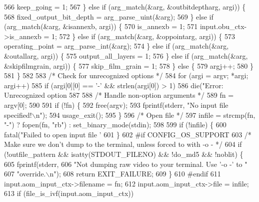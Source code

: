 \begin{DoxyCodeInclude}
{{{{{{{{{{{{{{{{{{{{{{{{{{{{566       keep\_going = 1;
567     \} \textcolor{keywordflow}{else} \textcolor{keywordflow}{if} (arg\_match(&arg, &outbitdeptharg, argi)) \{
568       fixed\_output\_bit\_depth = arg\_parse\_uint(&arg);
569     \} \textcolor{keywordflow}{else} \textcolor{keywordflow}{if} (arg\_match(&arg, &isannexb, argi)) \{
570       is\_annexb = 1;
571       input.obu\_ctx->is\_annexb = 1;
572     \} \textcolor{keywordflow}{else} \textcolor{keywordflow}{if} (arg\_match(&arg, &oppointarg, argi)) \{
573       operating\_point = arg\_parse\_int(&arg);
574     \} \textcolor{keywordflow}{else} \textcolor{keywordflow}{if} (arg\_match(&arg, &outallarg, argi)) \{
575       output\_all\_layers = 1;
576     \} \textcolor{keywordflow}{else} \textcolor{keywordflow}{if} (arg\_match(&arg, &skipfilmgrain, argi)) \{
577       skip\_film\_grain = 1;
578     \} \textcolor{keywordflow}{else} \{
579       argj++;
580     \}
581   \}
582 
583   \textcolor{comment}{/* Check for unrecognized options */}
584   \textcolor{keywordflow}{for} (argi = argv; *argi; argi++)
585     \textcolor{keywordflow}{if} (argi[0][0] == \textcolor{charliteral}{'-'} && strlen(argi[0]) > 1)
586       die(\textcolor{stringliteral}{"Error: Unrecognized option %
587 
588   \textcolor{comment}{/* Handle non-option arguments */}
589   fn = argv[0];
590 
591   \textcolor{keywordflow}{if} (!fn) \{
592     free(argv);
593     fprintf(stderr, \textcolor{stringliteral}{"No input file specified!\(\backslash\)n"});
594     usage\_exit();
595   \}
596   \textcolor{comment}{/* Open file */}
597   infile = strcmp(fn, \textcolor{stringliteral}{"-"}) ? fopen(fn, \textcolor{stringliteral}{"rb"}) : set\_binary\_mode(stdin);
598 
599   \textcolor{keywordflow}{if} (!infile) \{
600     fatal(\textcolor{stringliteral}{"Failed to open input file '%
601   \}
602 \textcolor{preprocessor}{#if CONFIG\_OS\_SUPPORT}
603   \textcolor{comment}{/* Make sure we don't dump to the terminal, unless forced to with -o - */}
604   \textcolor{keywordflow}{if} (!outfile\_pattern && isatty(STDOUT\_FILENO) && !do\_md5 && !noblit) \{
605     fprintf(stderr,
606             \textcolor{stringliteral}{"Not dumping raw video to your terminal. Use '-o -' to "}
607             \textcolor{stringliteral}{"override.\(\backslash\)n"});
608     \textcolor{keywordflow}{return} EXIT\_FAILURE;
609   \}
610 \textcolor{preprocessor}{#endif}
611   input.aom\_input\_ctx->filename = fn;
612   input.aom\_input\_ctx->file = infile;
613   \textcolor{keywordflow}{if} (file\_is\_ivf(input.aom\_input\_ctx))
}}}}}}}}}}}}}}}}}}}}}}}}}}}}}}
\end{DoxyCodeInclude}
